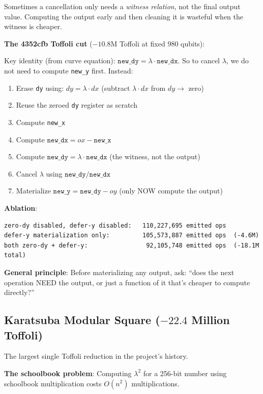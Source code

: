 \documentclass[11pt,a4paper]{article}
\begin{document}
Sometimes a cancellation only needs a \emph{witness relation}, not the final output value.
Computing the output early and then cleaning it is wasteful when the witness is cheaper.

\textbf{The 4352cfb Toffoli cut} ($-10.8$M Toffoli at fixed 980 qubits):

Key identity (from curve equation): $\texttt{new\_dy} = \lambda \cdot \texttt{new\_dx}$.
So to cancel $\lambda$, we do not need to compute \texttt{new\_y} first. Instead:
\begin{enumerate}
  \item Erase \texttt{dy} using: $dy = \lambda \cdot dx$ (subtract $\lambda \cdot dx$ from
    $dy \to$ zero)
  \item Reuse the zeroed \texttt{dy} register as scratch
  \item Compute \texttt{new\_x}
  \item Compute $\texttt{new\_dx} = ox - \texttt{new\_x}$
  \item Compute $\texttt{new\_dy} = \lambda \cdot \texttt{new\_dx}$ (the witness, not the output)
  \item Cancel $\lambda$ using $\texttt{new\_dy}/\texttt{new\_dx}$
  \item Materialize $\texttt{new\_y} = \texttt{new\_dy} - oy$ (only NOW compute the output)
\end{enumerate}

\textbf{Ablation}:
\begin{lstlisting}
zero-dy disabled, defer-y disabled:   110,227,695 emitted ops
defer-y materialization only:         105,573,887 emitted ops  (-4.6M)
both zero-dy + defer-y:                92,105,748 emitted ops  (-18.1M total)
\end{lstlisting}

\textbf{General principle}: Before materializing any output, ask: ``does the next operation NEED
the output, or just a function of it that's cheaper to compute directly?''

\subsection{Karatsuba Modular Square ($-22.4$ Million Toffoli)}

The largest single Toffoli reduction in the project's history.

\textbf{The schoolbook problem}: Computing $\lambda^2$ for a 256-bit number using schoolbook
multiplication costs $O(n^2)$ multiplications.
\end{document}
